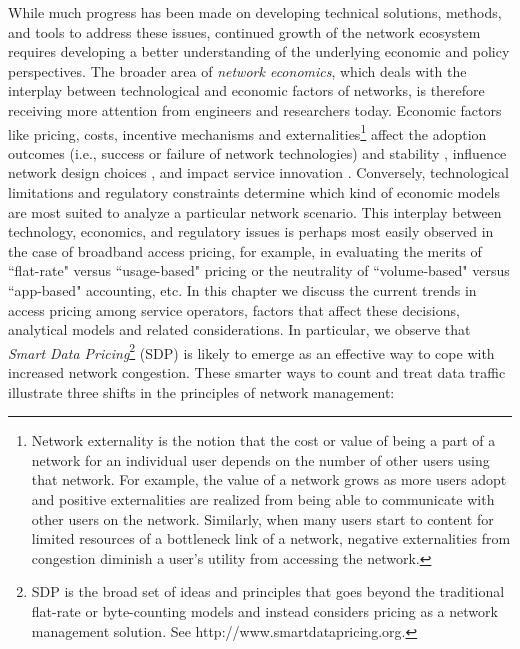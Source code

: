 While much progress has been made on developing technical solutions, methods, and tools to address these issues, continued growth of the network ecosystem requires developing a better understanding of the underlying economic and policy perspectives. The broader area of \emph{network economics}, which deals with the interplay between technological and economic factors of networks, is therefore receiving more attention from engineers and researchers today. Economic factors like pricing, costs, incentive mechanisms and externalities\footnote{Network externality is the notion that the cost or value of being a part of a network for an individual user depends on the number of other users using that network. For example, the value of a network grows as more users adopt and positive externalities are realized from being able to communicate with other users on the network. Similarly, when many users start to content for limited resources of a bottleneck link of a network, negative externalities from congestion diminish a user's utility from accessing the network.} affect the  adoption outcomes (i.e., success or failure of network technologies) and stability \cite{Sen2010,Joseph2007,wifi-3g-infocom}, influence network design choices \cite{Sen2011-MVF,Sen2009-SVS}, and impact service innovation \cite{Zhang2010}. Conversely, technological limitations and regulatory constraints determine which kind of economic models are most suited to analyze a particular network scenario. This interplay between technology, economics, and regulatory issues is perhaps most easily observed in the case of broadband access pricing, for example, in evaluating the merits of ``flat-rate" versus ``usage-based" pricing or the neutrality of ``volume-based" versus ``app-based" accounting, etc. In this chapter we discuss the current trends in access pricing among service operators, factors that affect these decisions, analytical models and related considerations. In particular, we observe that \emph{Smart Data Pricing}\footnote{SDP is the broad set of ideas and principles that goes beyond the traditional flat-rate or byte-counting models and instead considers pricing as a network management solution. See http://www.smartdatapricing.org.} (SDP) is likely to emerge as an effective way to cope with increased network congestion. These smarter ways to count and treat data traffic illustrate three shifts in the principles of network management:

